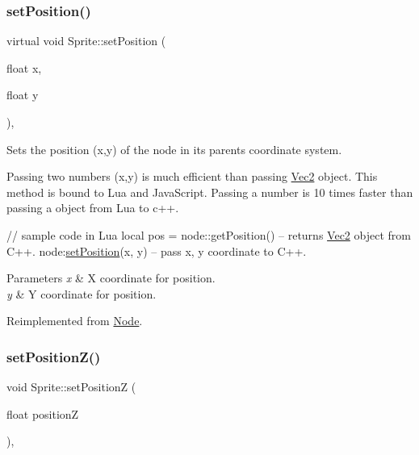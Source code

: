\subsubsection{\texorpdfstring{set\+Position()}{setPosition()}\hspace{0.1cm}{\footnotesize\ttfamily [4/4]}}
{\footnotesize\ttfamily virtual void Sprite\+::set\+Position (\begin{DoxyParamCaption}\item[{float}]{x,  }\item[{float}]{y }\end{DoxyParamCaption})\hspace{0.3cm}{\ttfamily [override]}, {\ttfamily [virtual]}}

Sets the position (x,y) of the node in its parent\textquotesingle{}s coordinate system.

Passing two numbers (x,y) is much efficient than passing \hyperlink{classVec2}{Vec2} object. This method is bound to Lua and Java\+Script. Passing a number is 10 times faster than passing a object from Lua to c++.


\begin{DoxyCode}
\textcolor{comment}{// sample code in Lua}
local pos  = node::getPosition()  -- returns \hyperlink{classVec2}{Vec2} \textcolor{keywordtype}{object} from C++.
node:\hyperlink{classSprite_aace7c480af3721709b218bdc579f8903}{setPosition}(x, y)            -- pass x, y coordinate to C++.
\end{DoxyCode}



\begin{DoxyParams}{Parameters}
{\em x} & X coordinate for position. \\
\hline
{\em y} & Y coordinate for position. \\
\hline
\end{DoxyParams}


Reimplemented from \hyperlink{classNode_aaa8545c103ef1b35e5076dbedab93af5}{Node}.

\mbox{\label{classSprite_ac22643ba4c10444cce30e0f100bfb041}} 
\subsubsection{\texorpdfstring{set\+Position\+Z()}{setPositionZ()}\hspace{0.1cm}{\footnotesize\ttfamily [1/2]}}
{\footnotesize\ttfamily void Sprite\+::set\+PositionZ (\begin{DoxyParamCaption}\item[{float}]{positionZ }\end{DoxyParamCaption})\hspace{0.3cm}{\ttfamily [override]}, {\ttfamily [virtual]}}

